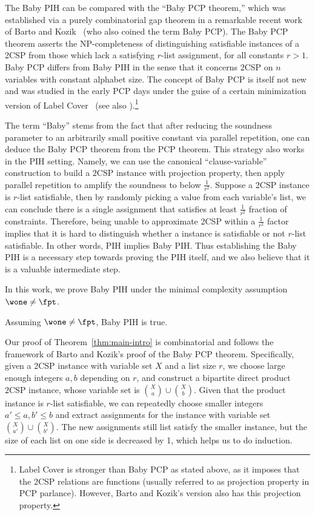 The Baby PIH can be compared with the ``Baby PCP theorem,'' which was established via a purely combinatorial gap theorem in a remarkable recent work of Barto and Kozik~\cite{BK22} (who also coined the term Baby PCP). 
The Baby PCP theorem asserts the NP-completeness of distinguishing satisfiable instances of a 2CSP from those which lack a satisfying $r$-list assignment, for all constants $r > 1$.   Baby PCP differs from Baby PIH in the sense that it concerns 2CSP on $n$ variables with constant alphabet size.  The concept of Baby PCP is itself not new and was studied in the early PCP days under the guise of a certain minimization version of Label Cover~\cite{ABSS97} (see also \cite{DS04}).\footnote{Label Cover is stronger than Baby PCP as stated above, as it imposes that the 2CSP relations are functions (usually referred to as projection property in PCP parlance). However, Barto and Kozik's version also has this projection property.} 

The term ``Baby'' stems from the fact that after reducing the soundness parameter to an arbitrarily small positive constant via parallel repetition, one can deduce the Baby PCP theorem from the PCP theorem.  This strategy also works in the PIH setting. Namely, we can use the canonical ``clause-variable'' construction to build a 2CSP instance with projection property, then apply parallel repetition \cite{Rao11} to amplify the soundness to below $\frac{1}{r^2}$. Suppose a 2CSP instance is $r$-list satisfiable, then by randomly picking a value from each variable's list, we can conclude there is a single assignment that satisfies at least $\frac{1}{r^2}$ fraction of constraints. Therefore, being unable to approximate 2CSP within a $\frac{1}{r^2}$ factor implies that it is hard to distinguish whether a instance is satisfiable or not $r$-list satisfiable. In other words, PIH implies Baby PIH. Thus establishing the Baby PIH is a necessary step towards proving the PIH itself, and we also believe that it is a valuable intermediate step. 

In this work, we prove Baby PIH under the minimal complexity assumption $\wone\neq\fpt$. 

\begin{theorem}
\label{thm:main-intro}
    Assuming $\wone\neq\fpt$, Baby PIH is true.
\end{theorem}

Our proof of Theorem~\ref{thm:main-intro} is combinatorial and follows the framework of Barto and Kozik's proof of the Baby PCP theorem. Specifically, given a 2CSP instance with variable set $X$ and a list size $r$, we choose large enough integers $a,b$ depending on $r$, and construct a bipartite direct product 2CSP instance, whose variable set is $\binom{X}{a}\cup\binom{X}{b}$. Given that the product instance is $r$-list satisfiable, we can repeatedly choose smaller integers $a' \le a, b' \le b$ and extract assignments for the instance with variable set $\binom{X}{a'}\cup \binom{X}{b'}$. The new assignments still list satisfy the smaller instance, but the size of each list on one side is decreased by 1, which helps us to do induction.

